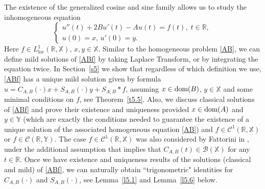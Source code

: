 \documentclass[11pt]{amsart}
\numberwithin{equation}{section}
\newcommand{\SAB}{S_{A,B}}
\newcommand{\CAB}{C_{A,B}}
\newcommand{\RR}{{\mathbb R}}
\theoremstyle{remark}
\theoremstyle{definition}
\newcommand\bX{{\mathbb X}}
\newcommand\bY{{\mathbb Y}}
\newcommand{\dom}{\text{\rm{dom}}}
\begin{document}
The existence of the generalized cosine and sine family allows us to study the inhomogeneous equation  
\begin{equation}\label{ABf}
	\begin{cases}
		u''(t) + 2Bu'(t) - Au(t) = f(t),\; t\in\RR,\\
		u(0) = x,\,
		u'(0) = y.
	\end{cases}
\end{equation}
Here $f \in L^1_{\mathrm{loc}}(\mathbb{R}, \bX)$, $x, y \in\bX$. Similar to the homogeneous problem \eqref{AB}, we can define mild solutions of \eqref{ABf} by taking Laplace Transform, or by integrating the equation twice. In Section~\ref{s5} we show that regardless of which definition we use, \eqref{ABf} has a unique mild solution given by formula $u=\CAB(\cdot)x+\SAB(\cdot)y+\SAB*f$, assuming $x\in\dom(B)$, $y\in\bX$ and some minimal conditions on $f$, see Theorem~\ref{t5.5}. Also, we discuss classical solutions of \eqref{ABf} and prove their existence and uniqueness provided $x\in\dom(A)$ and $y\in\bY$ (which are exactly the conditions needed to guarantee the existence of a unique solution of the associated homogeneous equation \eqref{AB}) and  $f\in\mathcal{C}^1(\RR,\bX)$ or $f\in\mathcal{C}(\RR,\bY)$. The case $f\in\mathcal{C}^1(\RR,\bX)$ was also considered by Fattorini in \cite{Fa}, under the additional assumption that implies that $\CAB(t)\in\mathcal{B}(\bX)$ for any $t\in\RR$. 
Once we have existence and uniqueness results of the solutions (classical and mild) of \eqref{ABf}, we can naturally obtain ``trigonometric" identities for $\CAB(\cdot)$ and $\SAB(\cdot)$, see Lemma~\ref{l5.1} and Lemma~\ref{l5.6} below. 
	
\end{document}
